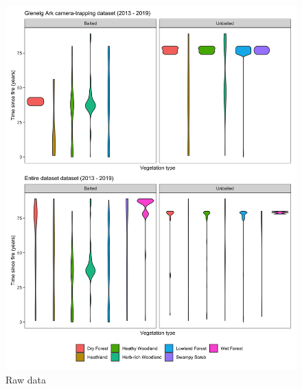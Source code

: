 \documentclass[11pt,a4paper,titlepage,twoside,openright]{style/unimelbthesis}
\begin{document}
\begin{mainmatter}
\begin{figure}
{\centering \includegraphics[width=1\linewidth]{figure/raw_data_tsf_veg} 

}

\caption{Raw data}\label{fig:veg-tsf-violin}
\end{figure}
\newpage
\begin{figure}


\end{figure}
\end{mainmatter}
\end{document}
